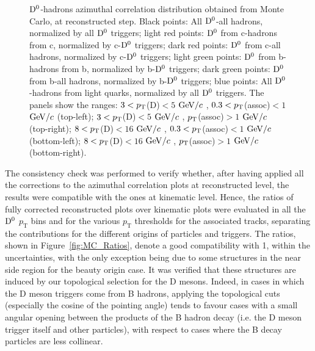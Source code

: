\begin{figure}
\caption{${\rm D^0}$-hadrons azimuthal correlation distribution obtained from Monte Carlo, at reconstructed step. Black points: All ${\rm D^0}$-all hadrons, normalized by all ${\rm D^0}$ triggers; light red points: ${\rm D^0}$ from c-hadrons from c, normalized by c-${\rm D^0}$ triggers; dark red points: ${\rm D^0}$ from c-all hadrons, normalized by c-${\rm D^0}$ triggers; light green points: ${\rm D^0}$ from b-hadrons from b, normalized by b-${\rm D^0}$ triggers; dark green points: ${\rm D^0}$ from b-all hadrons, normalized by b-${\rm D^0}$ triggers; blue points: All ${\rm D^0}$-hadrons from light quarks, normalized by all ${\rm D^0}$ triggers.
The panels show the ranges: $3 < p_{\rm T}$(D)$ < 5$ $\mathrm{GeV}/c$ , $0.3 < p_{\rm T}$(assoc)$ < 1$ $\mathrm{GeV}/c$  (top-left); $3 < p_{\rm T}$(D)$ < 5$ $\mathrm{GeV}/c$ , $p_{\rm T}$(assoc)$ > 1$ $\mathrm{GeV}/c$  (top-right); $8 < p_{\rm T}$(D)$ < 16$ $\mathrm{GeV}/c$ , $0.3 < p_{\rm T}$(assoc)$ < 1$ $\mathrm{GeV}/c$  (bottom-left); $8 < p_{\rm T}$(D)$ < 16$ $\mathrm{GeV}/c$ , $p_{\rm T}$(assoc)$ > 1$ $\mathrm{GeV}/c$  (bottom-right).}
\label{fig:MC_Reco}
\end{figure}

The consistency check was performed to verify whether, after having applied all the corrections to the azimuthal correlation plots at reconstructed level, the results were compatible with the ones at kinematic level. Hence, the ratios of fully corrected reconstructed plots over kinematic plots were evaluated in all the ${\rm D^0}$ $p_\text{T}$ bins and for the various $p_\text{T}$ thresholds for the associated tracks, separating the contributions for the different origins of particles and triggers. The ratios, shown in Figure~\ref{fig:MC_Ratios}, denote a good compatibility with 1, within the uncertainties, with the only exception being due to some structures in the near side region for the beauty origin case.
It was verified that these structures are induced by our topological selection for the D mesons. Indeed, in cases in which the D meson triggers come from B hadrons, applying the topological cuts (especially the cosine of the pointing angle) tends to favour cases with a small angular opening between the products of the B hadron decay (i.e. the D meson trigger itself and other particles), with respect to cases where the B decay particles are less collinear.

